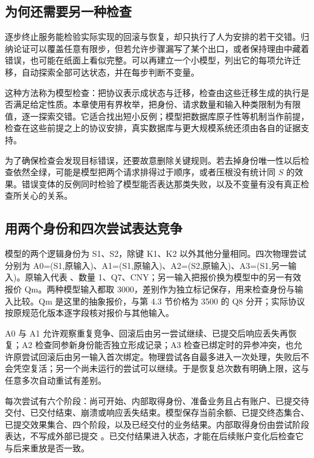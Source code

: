 \subsection*{为何还需要另一种检查}

逐步终止服务能检验实际实现的回滚与恢复，却只执行了人为安排的若干交错。归纳论证可以覆盖任意有限步，但若允许步骤漏写了某个出口，或者保持理由中藏着错误，也可能在纸面上看似完整。可以再建立一个小模型，列出它的每项允许迁移，自动探索全部可达状态，并在每步判断不变量。

这种方法称为模型检查：把协议表示成状态与迁移，检查由这些迁移生成的执行是否满足给定性质。本章使用有界枚举，把身份、请求数量和输入种类限制为有限值，逐一探索交错。它适合找出短小反例；模型把数据库原子性等机制当作前提，检查在这些前提之上的协议安排，真实数据库与更大规模系统还须由各自的证据支持。

为了确保检查会发现目标错误，还要故意删除关键规则。若去掉身份唯一性以后检查依然全绿，可能是模型把两个请求排得过于顺序，或者压根没有统计同 \(S\) 的效果。错误变体的反例同时检验了模型能否表达那类失败，以及不变量有没有真正检查所关心的关系。

\subsection*{用两个身份和四次尝试表达竞争}

模型的两个逻辑身份为 S1、S2，除键 K1、K2 以外其他分量相同。四次物理尝试分别为 A0=(S1,原输入)、A1=(S1,原输入)、A2=(S2,原输入)、A3=(S1,另一输入)。原输入代表 、数量 1、Q7、CNY；另一输入把报价换为模型中的另一有效报价 Qm。两种模型输入都取 3000，差别作为独立标记保存，用来检查身份与输入比较。Qm 是这里的抽象报价，与第 4.3 节价格为 3500 的 Q8 分开；实际协议按原规范化版本逐字段核对报价与其他输入。

A0 与 A1 允许观察重复竞争、回滚后由另一尝试继续、已提交后响应丢失再恢复；A2 检查同参新身份能否独立形成记录；A3 检查已绑定时的异参冲突，也允许原尝试回滚后由另一输入首次绑定。物理尝试各自最多进入一次处理，失败后不会凭空复活；另一个尚未运行的尝试可以继续。于是恢复总次数有明确上限，这与任意多次自动重试有差别。

每次尝试有六个阶段：尚可开始、内部取得身份、准备业务且占有账户、已提交待交付、已交付结束、崩溃或响应丢失结束。模型保存当前余额、已提交终态集合、已提交效果集合、四个阶段，以及已经交付的业务结果。内部取得身份由尝试阶段表达，不写成外部已提交 。已交付结果进入状态，才能在后续账户变化后检查它与后来重放是否一致。



